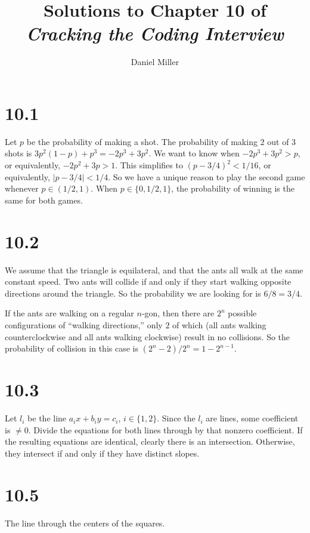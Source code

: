 \documentclass{article}
\title{Solutions to Chapter 10 of \emph{Cracking the Coding Interview}}
\author{Daniel Miller}
\date{}
\begin{document}
\maketitle





\section*{10.1}

Let $p$ be the probability of making a shot. The probability of making $2$ out 
of $3$ shots is $3p^2(1-p)+p^3 = -2p^3 + 3p^2$. We want to know when 
$-2p^3+3p^2>p$, or equivalently, $-2p^2+3p>1$. This simplifies to 
$(p-3/4)^2<1/16$, or equivalently, $|p-3/4|<1/4$. So we have a unique reason to 
play the second game whenever $p\in (1/2,1)$. When $p\in \{0,1/2,1\}$, the 
probability of winning is the same for both games. 





\section*{10.2}

We assume that the triangle is equilateral, and that the ants all walk at the 
same constant speed. Two ants will collide if and only if they start walking 
opposite directions around the triangle. So the probability we are looking 
for is $6/8 = 3/4$. 

If the ants are walking on a regular $n$-gon, then there are $2^n$ possible 
configurations of ``walking directions,'' only $2$ of which (all ants walking 
counterclockwise and all ants walking clockwise) result in no collisions. So 
the probability of collision in this case is $(2^n-2)/2^n = 1-2^{n-1}$. 





\section*{10.3}

Let $l_i$ be the line $a_i x + b_i y = c_i$, $i\in \{1,2\}$. Since the $l_i$ 
are lines, some coefficient is $\ne 0$. Divide the equations for both lines 
through by that nonzero coefficient. If the resulting equations are identical, 
clearly there is an intersection. Otherwise, they intersect if and only if they 
have distinct slopes. 





\section*{10.5}

The line through the centers of the squares. 
\end{document}

